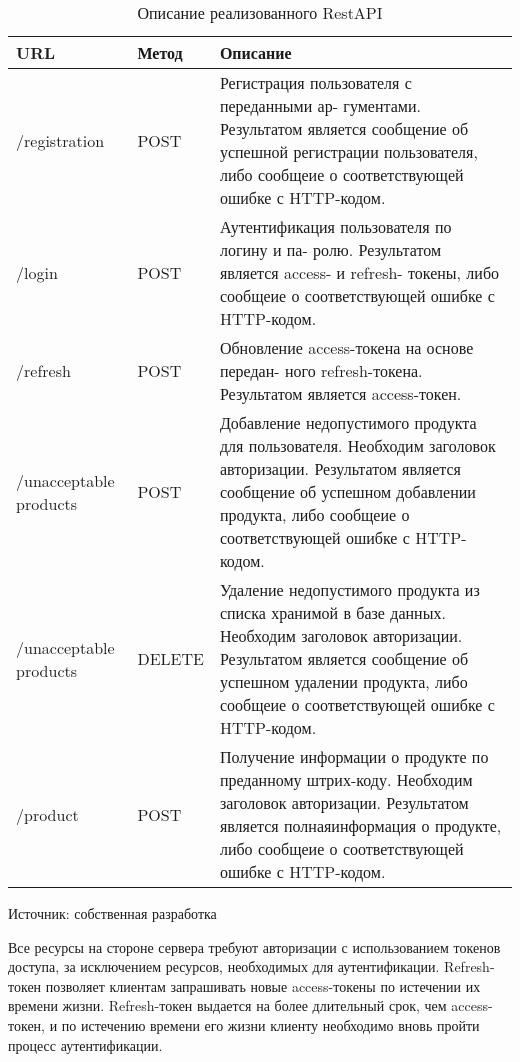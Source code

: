 \begin{singlespacing}
\begin{table}[H]
	\caption{Описание реализованного RestAPI}\label{APIdescription}
	\begin{tabular}{|  p{80pt} |  p{80pt} |  p{290pt} |}
	\hline 
	URL & Метод & Описание \\
	\hline
	/registration & POST & Регистрация пользователя с переданными ар-
	гументами. Результатом является сообщение об успешной регистрации пользователя, либо сообщеие о соответствующей ошибке с HTTP-кодом. \\
	\hline
	/login & POST & Аутентификация пользователя по логину и па-
	ролю. Результатом является access- и refresh- токены, либо сообщеие о соответствующей ошибке с HTTP-кодом. \\
	\hline
	/refresh & POST & Обновление access-токена на основе передан-
	ного refresh-токена. Результатом является access-токен. \\
	\hline
	/unacceptable products & POST & Добавление недопустимого продукта для пользователя. Необходим заголовок авторизации. Результатом является сообщение об успешном добавлении продукта, либо сообщеие о соответствующей ошибке с HTTP-кодом. \\
	\hline
	/unacceptable products & DELETE & Удаление недопустимого продукта из списка хранимой в базе данных. Необходим заголовок авторизации. Результатом является сообщение об успешном удалении продукта, либо сообщеие о соответствующей ошибке с HTTP-кодом. \\
	\hline
	/product & POST & Получение информации о продукте по преданному штрих-коду. Необходим заголовок авторизации. Результатом является полнаяинформация о продукте, либо сообщеие о соответствующей ошибке с HTTP-кодом. \\
	\hline
	\end{tabular}
Источник: собственная разработка
\end{table}
\end{singlespacing}
Все ресурсы на стороне сервера требуют авторизации с использованием токенов доступа, за исключением ресурсов, необходимых для аутентификации. Refresh-токен позволяет клиентам запрашивать новые access-токены по истечении их времени жизни. Refresh-токен выдается на более длительный срок, чем access-токен, и по истечению времени его жизни клиенту необходимо вновь пройти процесс аутентификации. 

\clearpage